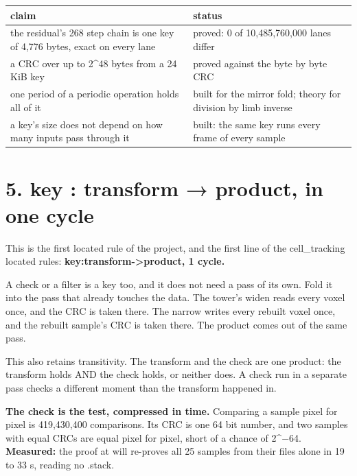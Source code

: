 {\small
\setlength{\tabcolsep}{6pt}
\begin{longtable}{>{\RaggedRight\arraybackslash}p{}>{\RaggedRight\arraybackslash}p{}}
\toprule
claim & status \\
\midrule
\endhead
the residual's 268 step chain is one key of 4,776 bytes, exact on every lane & proved: 0 of 10,485,760,000 lanes differ \\
a CRC over up to 2\textasciicircum{}48 bytes from a 24 KiB key & proved against the byte by byte CRC \\
one period of a periodic operation holds all of it & built for the mirror fold; theory for division by limb inverse \\
a key's size does not depend on how many inputs pass through it & built: the same key runs every frame of every sample \\
\bottomrule
\end{longtable}
}

\section{\texorpdfstring{5. key : transform → product, in one cycle}{5. key : transform → product, in one cycle}}

This is the first located rule of the project, and the first line of the cell\_\allowbreak{}tracking located rules: \textbf{key:transform->product, 1 cycle.}

A check or a filter is a key too, and it does not need a pass of its own. Fold it into the pass that already touches the data. The tower's widen reads every voxel once, and the CRC is taken there. The narrow writes every rebuilt voxel once, and the rebuilt sample's CRC is taken there. The product comes out of the same pass.

This also retains transitivity. The transform and the check are one product: the transform holds AND the check holds, or neither does. A check run in a separate pass checks a different moment than the transform happened in.

\textbf{The check is the test, compressed in time.} Comparing a sample pixel for pixel is 419,430,400 comparisons. Its CRC is one 64 bit number, and two samples with equal CRCs are equal pixel for pixel, short of a chance of 2\textasciicircum{}−64. \textbf{Measured:} the proof at will re-proves all 25 samples from their files alone in 19 to 33 s, reading no .stack.

